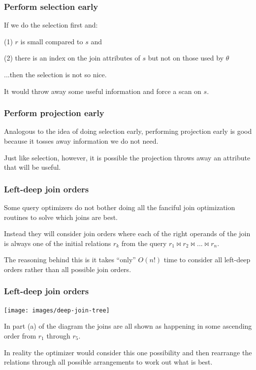 \begin{frame}
\frametitle{Perform selection early}

If we do the selection first and: 

(1) $r$ is small compared to $s$ and 

(2) there is an index on the join attributes of $s$ but not on those used by $\theta$ 

...then the selection is not so nice. 

It would throw away some useful information and force a scan on $s$.


\end{frame}

\begin{frame}
\frametitle{Perform projection early}

Analogous to the idea of doing selection early, performing projection early is good because it tosses away information we do not need.

Just like selection, however, it is possible the projection throws away an attribute that will be useful.


\end{frame}

\begin{frame}
\frametitle{Left-deep join orders}

Some query optimizers do not bother doing all the fanciful join optimization routines to solve which joins are best. 

Instead they will consider join orders where each of the right operands of the join is always one of the initial relations $r_{k}$ from the query $r_{1} \bowtie r_{2} \bowtie ... \bowtie r_{n}$. 

The reasoning behind this is it takes ``only'' $O(n!)$ time to consider all left-deep orders rather than all possible join orders.


\end{frame}

\begin{frame}
\frametitle{Left-deep join orders}

\begin{center}
	\texttt{[image: images/deep-join-tree]}
\end{center}

In part (a) of the diagram the joins are all shown as happening in some ascending order  from $r_{1}$ through $r_{5}$.

In reality the optimizer would consider this one possibility and then rearrange the relations through all possible arrangements to work out what is best.

\end{frame}

